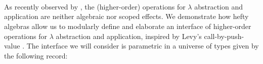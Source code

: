 \begin{code}[hide]%
\>[0]\AgdaSpace{}%
\AgdaSpace{}%
\<%
\\
\>[0][@{}l@{\AgdaIndent{0}}]%
\>[2]\AgdaSpace{}%
\AgdaSpace{}%
\AgdaSpace{}%
\AgdaSymbol{(}\AgdaSymbol{;}\AgdaSpace{}%
\AgdaOperator{\AgdaFunction{\AgdaUnderscore{}>>\AgdaUnderscore{}}}\AgdaSymbol{)}\<%
\\
%
\>[2]\AgdaSpace{}%
\AgdaSpace{}%
\AgdaSpace{}%
\AgdaSymbol{(}\AgdaSymbol{;}\AgdaSpace{}%
\AgdaOperator{\AgdaFunction{\AgdaUnderscore{}>>\AgdaUnderscore{}}}\AgdaSymbol{)}\<%
\\
%
\>[2]\AgdaSpace{}%
\<%
\\
%
\>[2]\AgdaSpace{}%
\<%
\\
%
\>[2]\AgdaSpace{}%
\<%
\\
%
\>[2]\AgdaSpace{}%
\<%
\\
%
\>[2]\AgdaSpace{}%
\<%
\\
%
\>[2]\AgdaSpace{}%
\AgdaSpace{}%
\AgdaSpace{}%
\AgdaSpace{}%
\<%
\end{code}

As recently observed by \citet{BergSPW21}, the (higher-order) operations for $\lambda$ abstraction and application are neither algebraic nor scoped effects.
We demonstrate how hefty algebras allow us to modularly define and elaborate an interface of higher-order operations for $\lambda$ abstraction and application, inspired by Levy's call-by-push-value \citep{Levy06}.
The interface we will consider is parametric in a universe of types given by the following record:

